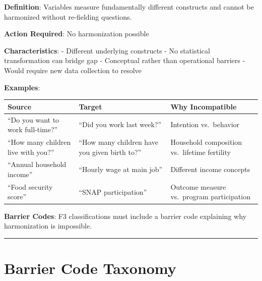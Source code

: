 \documentclass[
  letterpaper,
]{report}
\begin{document}
\textbf{Definition}: Variables measure fundamentally different
constructs and cannot be harmonized without re-fielding questions.

\textbf{Action Required}: No harmonization possible

\textbf{Characteristics}: - Different underlying constructs - No
statistical transformation can bridge gap - Conceptual rather than
operational barriers - Would require new data collection to resolve

\textbf{Examples}:

\begin{longtable}[]{@{}
  >{\raggedright\arraybackslash}p{}
  >{\raggedright\arraybackslash}p{}
  >{\raggedright\arraybackslash}p{}@{}}
\toprule\noalign{}
\begin{minipage}[b]{\linewidth}\raggedright
Source
\end{minipage} & \begin{minipage}[b]{\linewidth}\raggedright
Target
\end{minipage} & \begin{minipage}[b]{\linewidth}\raggedright
Why Incompatible
\end{minipage} \\
\midrule\noalign{}
\endhead
\bottomrule\noalign{}
\endlastfoot
``Do you want to work full-time?'' & ``Did you work last week?'' &
Intention vs.~behavior \\
``How many children live with you?'' & ``How many children have you
given birth to?'' & Household composition vs.~lifetime fertility \\
``Annual household income'' & ``Hourly wage at main job'' & Different
income concepts \\
``Food security score'' & ``SNAP participation'' & Outcome measure
vs.~program participation \\
\end{longtable}

\textbf{Barrier Codes}: F3 classifications must include a barrier code
explaining why harmonization is impossible.

\begin{center}\rule{0.5\linewidth}{0.5pt}\end{center}

\section{Barrier Code Taxonomy}\label{barrier-code-taxonomy}
\end{document}
